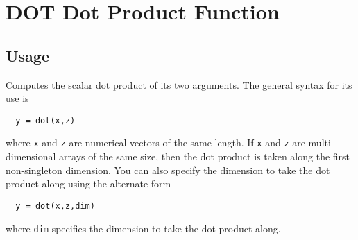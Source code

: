 \section{DOT Dot Product Function}

\subsection{Usage}

Computes the scalar dot product of its two arguments.  The general
syntax for its use is
\begin{verbatim}
  y = dot(x,z)
\end{verbatim}
where \verb|x| and \verb|z| are numerical vectors of the same length.  If 
\verb|x| and \verb|z| are multi-dimensional arrays of the same size, then
the dot product is taken along the first non-singleton dimension.
You can also specify the dimension to take the dot product along using
the alternate form
\begin{verbatim}
  y = dot(x,z,dim)
\end{verbatim}
where \verb|dim| specifies the dimension to take the dot product along.
